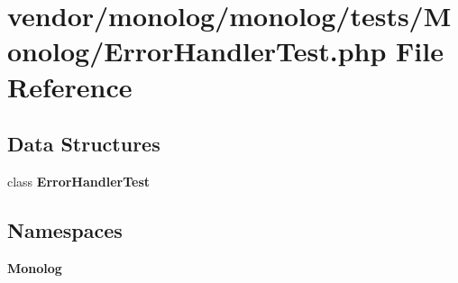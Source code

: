 \section{vendor/monolog/monolog/tests/\+Monolog/\+Error\+Handler\+Test.php File Reference}
\label{monolog_2monolog_2tests_2_monolog_2_error_handler_test_8php}
\subsection*{Data Structures}
\begin{DoxyCompactItemize}
\item 
class {\bf Error\+Handler\+Test}
\end{DoxyCompactItemize}
\subsection*{Namespaces}
\begin{DoxyCompactItemize}
\item 
 {\bf Monolog}
\end{DoxyCompactItemize}
